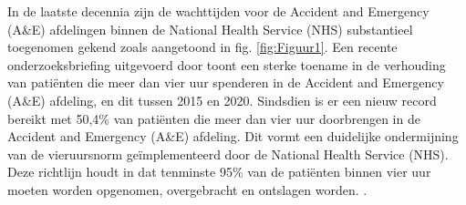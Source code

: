 






In de laatste decennia zijn de wachttijden voor de Accident and Emergency (A\&E) afdelingen binnen de National Health Service (NHS) substantieel toegenomen gekend zoals aangetoond in fig. \ref{fig:Figuur1}. Een recente onderzoeksbriefing uitgevoerd door \autocite{Baker2024} toont een sterke toename in de verhouding van patiënten die meer dan vier uur spenderen in de Accident and Emergency (A\&E) afdeling, en dit tussen 2015 en 2020. Sindsdien is er een nieuw record bereikt met 50,4\% van patiënten die meer dan vier uur doorbrengen in de Accident and Emergency (A\&E) afdeling. Dit vormt een duidelijke ondermijning van de vieruursnorm geïmplementeerd door de National Health Service (NHS). Deze richtlijn houdt in dat tenminste 95\% van de patiënten binnen vier uur moeten worden opgenomen, overgebracht en ontslagen worden. \autocite{NationalStatisticsONS}.

